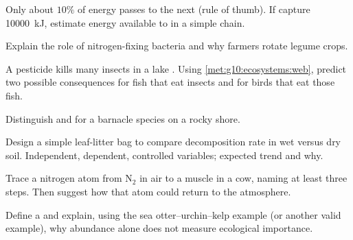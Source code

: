 \begin{exercise}[$\star\star$]\label{exo:g10:ecosystems:6}
Only about $10\%$ of energy passes to the next  (rule of
thumb). If  capture \qty{10000}{kJ}, estimate energy available to
 in a simple chain.
\end{exercise}

\begin{exercise}[$\star\star$]\label{exo:g10:ecosystems:7}
Explain the role of nitrogen-fixing bacteria and why farmers rotate
legume crops.
\end{exercise}

\begin{exercise}[$\star\star$]\label{exo:g10:ecosystems:8}
A pesticide kills many insects in a lake . Using
\cref{met:g10:ecosystems:web}, predict two possible consequences for
fish that eat insects and for birds that eat those fish.
\end{exercise}

\begin{exercise}[$\star\star$]\label{exo:g10:ecosystems:9}
Distinguish  and  for a barnacle species on a rocky shore.
\end{exercise}

\begin{exercise}[$\star\star\star$]\label{exo:g10:ecosystems:10}
Design a simple leaf-litter bag  to compare decomposition rate
in wet versus dry soil. Independent, dependent, controlled variables;
expected trend and why.
\end{exercise}

\begin{exercise}[$\star\star\star$]\label{exo:g10:ecosystems:11}
Trace a nitrogen atom from $\mathrm{N_2}$ in air to a muscle  in
a cow, naming at least three steps. Then suggest how that atom could
return to the atmosphere.
\end{exercise}

\begin{exercise}[$\star\star$]\label{exo:g10:ecosystems:12}
Define a  and explain, using the sea otter--urchin--kelp
example (or another valid example), why abundance alone does not measure
ecological importance.
\end{exercise}

